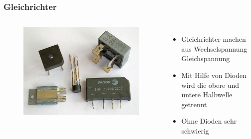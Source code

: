 \begin{frame}
  \frametitle{Gleichrichter}
  \begin{columns}[c]
    \begin{center}
      \begin{figure}
        \includegraphics[width=1\textwidth,height=.85\textheight,keepaspectratio]{a05/Brueckengleichrichter_Bilder.jpg}
      \end{figure}
    \end{center}
    \begin{itemize}
      \item Gleichrichter machen aus Wechselspannung Gleichspannung
      \item Mit Hilfe von Dioden wird die obere und untere Halbwelle getrennt
      \item Ohne Dioden sehr schwierig
    \end{itemize}
  \end{columns}
\end{frame}

